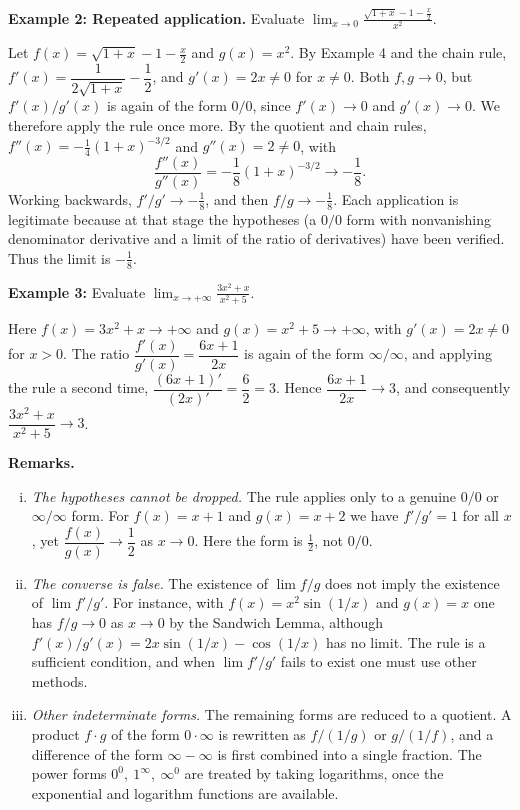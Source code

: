 \documentclass[a4paper,11pt,abstracton]{scrartcl}
\theoremstyle{dotlessP}
\theoremstyle{dotlessS}
\theoremstyle{remark}
\theoremstyle{definition}
\begin{document}
\begin{example_box}
\textbf{Example 2: Repeated application.} Evaluate $\displaystyle\lim_{x\to0}\frac{\sqrt{1+x}-1-\frac x2}{x^2}$.
\end{example_box}
\begin{example_claim_box}
Let $f(x)=\sqrt{1+x}-1-\frac x2$ and $g(x)=x^2$. By Example 4 and the chain rule, $f'(x)=\dfrac1{2\sqrt{1+x}}-\dfrac12$, and $g'(x)=2x\ne0$ for $x\ne0$. Both $f,g\to0$, but $f'(x)/g'(x)$ is again of the form $0/0$, since $f'(x)\to0$ and $g'(x)\to0$. We therefore apply the rule once more. By the quotient and chain rules, $f''(x)=-\frac14(1+x)^{-3/2}$ and $g''(x)=2\ne0$, with
\[
    \frac{f''(x)}{g''(x)}=-\frac18(1+x)^{-3/2}\longrightarrow-\frac18.
\]
Working backwards, $f'/g'\to-\frac18$, and then $f/g\to-\frac18$. Each application is legitimate because at that stage the hypotheses (a $0/0$ form with nonvanishing denominator derivative and a limit of the ratio of derivatives) have been verified. Thus the limit is $-\tfrac18$.
\end{example_claim_box}

\begin{example_box}
\textbf{Example 3:} Evaluate $\displaystyle\lim_{x\to+\infty}\frac{3x^2+x}{x^2+5}$.
\end{example_box}
\begin{example_claim_box}
Here $f(x)=3x^2+x\to+\infty$ and $g(x)=x^2+5\to+\infty$, with $g'(x)=2x\ne0$ for $x>0$. The ratio $\dfrac{f'(x)}{g'(x)}=\dfrac{6x+1}{2x}$ is again of the form $\infty/\infty$, and applying the rule a second time, $\dfrac{(6x+1)'}{(2x)'}=\dfrac62=3$. Hence $\dfrac{6x+1}{2x}\to3$, and consequently $\dfrac{3x^2+x}{x^2+5}\to3$.
\end{example_claim_box}

\begin{remark_box}
\textbf{Remarks.}
\begin{enumerate}[(i)]
    \item \emph{The hypotheses cannot be dropped.} The rule applies only to a genuine $0/0$ or $\infty/\infty$ form. For $f(x)=x+1$ and $g(x)=x+2$ we have $f'/g'=1$ for all $x$, yet $\dfrac{f(x)}{g(x)}\to\dfrac12$ as $x\to0$. Here the form is $\tfrac12$, not $0/0$.
    \item \emph{The converse is false.} The existence of $\lim f/g$ does not imply the existence of $\lim f'/g'$. For instance, with $f(x)=x^2\sin(1/x)$ and $g(x)=x$ one has $f/g\to0$ as $x\to0$ by the Sandwich Lemma, although $f'(x)/g'(x)=2x\sin(1/x)-\cos(1/x)$ has no limit. The rule is a sufficient condition, and when $\lim f'/g'$ fails to exist one must use other methods.
    \item \emph{Other indeterminate forms.} The remaining forms are reduced to a quotient. A product $f\cdot g$ of the form $0\cdot\infty$ is rewritten as $f/(1/g)$ or $g/(1/f)$, and a difference of the form $\infty-\infty$ is first combined into a single fraction. The power forms $0^0,\ 1^\infty,\ \infty^0$ are treated by taking logarithms, once the exponential and logarithm functions are available.
\end{enumerate}
\end{remark_box}
\end{document}
